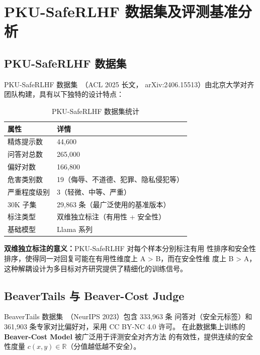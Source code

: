 \documentclass[12pt,a4paper,UTF8]{ctexart}
\begin{document}
\section{PKU-SafeRLHF 数据集及评测基准分析}
\label{sec:dataset}

\subsection{PKU-SafeRLHF 数据集}

PKU-SafeRLHF 数据集~\cite{ji2024pkusaferlhf}（ACL 2025 长文，
arXiv:2406.15513）由北京大学对齐团队构建，具有以下独特的设计特点：

\begin{table}[H]
  \centering
  \caption{PKU-SafeRLHF 数据集统计}
  \label{tab:dataset}
  \small
  \begin{tabular}{ll}
    \toprule
    \textbf{属性} & \textbf{详情} \\
    \midrule
    精炼提示数 & 44,600 \\
    问答对总数 & 265,000 \\
    偏好对数 & 166,800 \\
    危害类别数 & 19（侮辱、不道德、犯罪、隐私侵犯等）\\
    严重程度级别 & 3（轻微、中等、严重）\\
    30K 子集 & 29,863 条（最广泛使用的基准版本）\\
    标注类型 & 双维独立标注（有用性 + 安全性）\\
    基础模型 & Llama 系列 \\
    \bottomrule
  \end{tabular}
\end{table}

\noindent\textbf{双维独立标注的意义：}PKU-SafeRLHF 对每个样本分别标注有用
性排序和安全性排序，使得同一对回复可能在有用性维度上 A > B，而在安全性维
度上 B > A，这种解耦设计为多目标对齐研究提供了精细化的训练信号。

\subsection{BeaverTails 与 Beaver-Cost Judge}

BeaverTails 数据集~\cite{ji2023beavertails}（NeurIPS 2023）包含 333,963 条
问答对（安全元标签）和 361,903 条专家对比偏好对，采用 CC BY-NC 4.0 许可。
在此数据集上训练的 \textbf{Beaver-Cost Model} 被广泛用于评测安全对齐方法
的有效性，提供连续的安全性度量 $c(x,y)\in\mathbb{R}$（分值越低越不安全）。
\end{document}
